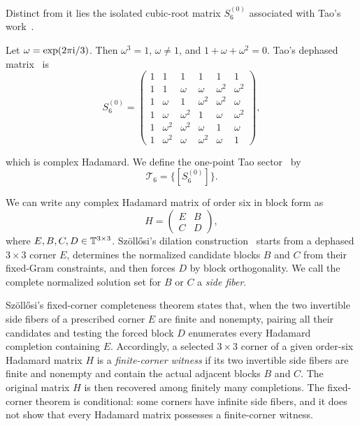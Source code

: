 Distinct from it lies the isolated cubic-root matrix $S_6^{(0)}$ associated with Tao's work~\cite{Tao2004,TadejZyczkowski2006,Szollosi2012FourParameter,Tadej2008}. \begin{definition}
Let $\omega=\exp(2\pi\mathrm i/3)$. Then $\omega^3=1$, $\omega\ne1$, and $1+\omega+\omega^2=0$. Tao's dephased matrix~\cite{Tao2004} is
\begin{equation}
S_6^{(0)}=
\begin{pmatrix}
1&1&1&1&1&1\\
1&1&\omega&\omega&\omega^2&\omega^2\\
1&\omega&1&\omega^2&\omega^2&\omega\\
1&\omega&\omega^2&1&\omega&\omega^2\\
1&\omega^2&\omega^2&\omega&1&\omega\\
1&\omega^2&\omega&\omega^2&\omega&1
\end{pmatrix},
\label{eq:taomatrix}
\end{equation}
\end{definition}
which is complex Hadamard. We define the one-point Tao sector~\cite{Tao2004} by
\begin{equation}
\mathcal T_6=\{[S_6^{(0)}]\}.
\label{eq:Taosector}
\end{equation}

We can write any complex Hadamard matrix of order six in block form as
\begin{equation}
H=
\begin{pmatrix}
E&B\\
C&D
\end{pmatrix},
\label{eq:blockform}
\end{equation}
where $E,B,C,D\in\mathbb T^{3\times3}$. Sz\"oll\H{o}si's dilation construction~\cite{Szollosi2012FourParameter} starts from a dephased $3\times3$ corner $E$, determines the normalized candidate blocks $B$ and $C$ from their fixed-Gram constraints, and then forces $D$ by block orthogonality. We call the complete normalized solution set for $B$ or $C$ a \emph{side fiber}.

Sz\"oll\H{o}si's fixed-corner completeness theorem states that, when the two invertible side fibers of a prescribed corner $E$ are finite and nonempty, pairing all their candidates and testing the forced block $D$ enumerates every Hadamard completion containing $E$. Accordingly, a selected $3\times3$ corner of a given order-six Hadamard matrix $H$ is a \emph{finite-corner witness} if its two invertible side fibers are finite and nonempty and contain the actual adjacent blocks $B$ and $C$. The original matrix $H$ is then recovered among finitely many completions.
The fixed-corner theorem is conditional: some corners have infinite side fibers, and it does not show that every Hadamard matrix possesses a finite-corner witness. 

